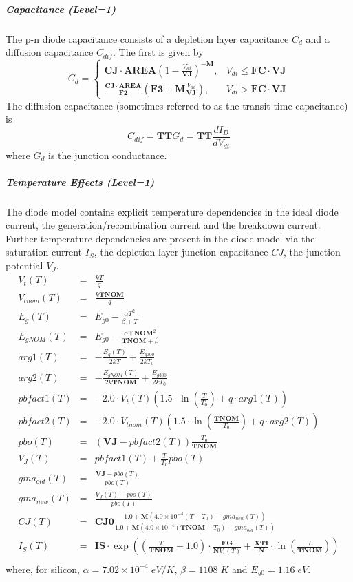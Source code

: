 \subparagraph{Capacitance (Level=1)}
The p-n diode capacitance consists of a depletion layer capacitance $C_d$ and a
diffusion capacitance $C_{dif}$.  The first is given by
\[
C_d = \left\{ \begin{array}{ll}
\mathbf{CJ}\cdot\mathbf{AREA} \left(1-\frac{V_{di}}{\mathbf{VJ}} \right)^{-\mathbf{M}}, &
V_{di} \leq \mathbf{FC \cdot VJ} \\
\frac{\mathbf{CJ}\cdot\mathbf{AREA}}{\mathbf{F2}}\left(\mathbf{F3}+\mathbf{M}\frac{V_{di}}{\mathbf{VJ}}\right),
& V_{di} > \mathbf{FC \cdot VJ}
\end{array}
\right.
\]
The diffusion capacitance (sometimes referred to as the transit time
capacitance) is
\[
C_{dif} = \mathbf{TT}G_d = \mathbf{TT}\frac{dI_D}{dV_{di}}
\]
where $G_d$ is the junction conductance.

\subparagraph{Temperature Effects (Level=1)}
The diode model contains explicit temperature dependencies in the ideal diode
current, the generation/recombination current and the breakdown current.
Further temperature dependencies are present in the diode model via the
saturation current $I_{S}$, the depletion layer junction capacitance $CJ$,
the junction potential $V_J$.
\begin{eqnarray*}
V_t(T) & = & \frac{kT}{q} \\
V_{tnom}(T) & = & \frac{k\mathbf{TNOM}}{q} \\
E_g(T) & = & E_{g0} - \frac{\alpha T^2}{\beta + T} \\
E_{gNOM}(T) & = & E_{g0} - \frac{\alpha\mathbf{TNOM}^2}{\mathbf{TNOM}+\beta} \\
arg1(T) & = & -\frac{E_g(T)}{2kT} + \frac{E_{g300}}{2kT_0} \\
arg2(T) & = & -\frac{E_{gNOM}(T)}{2k\mathbf{TNOM}} + \frac{E_{g300}}{2kT_0} \\
pbfact1(T) & = & -2.0\cdot V_t(T) \left(1.5\cdot\ln \left(\frac{T}{T_0}\right) + q\cdot arg1(T)\right) \\
pbfact2(T) & = & -2.0\cdot V_{tnom}(T) \left(1.5\cdot\ln \left(\frac{\mathbf{TNOM}}{T_0}\right) + q\cdot arg2(T)\right) \\
pbo(T) & = & \left(\mathbf{VJ}-pbfact2(T)\right)\frac{T_0}{\mathbf{TNOM}} \\
V_J(T) & = & pbfact1(T) + \frac{T}{T_0}pbo(T) \\
gma_{old}(T) & = & \frac{\mathbf{VJ}-pbo(T)}{pbo(T)} \\
gma_{new}(T) & = & \frac{V_J(T)-pbo(T)}{pbo(T)} \\
CJ(T) & = & \mathbf{CJ0}\frac{1.0+\mathbf{M}\left(4.0\times 10^{-4}\left(T-T_0\right)-gma_{new}(T)\right)}{1.0 + \mathbf{M}\left(4.0\times 10^{-4}\left(\mathbf{TNOM}-T_0\right)-gma_{old}(T)\right)} \\
I_S(T) & = & \mathbf{IS} \cdot\exp \left(\left(\frac{T}{\mathbf{TNOM}}-1.0\right) \cdot \frac{\mathbf{EG}}{\mathbf{N}V_t(T)} + \frac{\mathbf{XTI}}{\mathbf{N}} \cdot \ln \left(\frac{T}{\mathbf{TNOM}}\right)\right) \\
\end{eqnarray*}
where, for silicon, $\alpha = 7.02\times 10^{-4}\;eV/K$, $\beta =
1108\; K$ and $E_{g0} = 1.16\;eV$.

